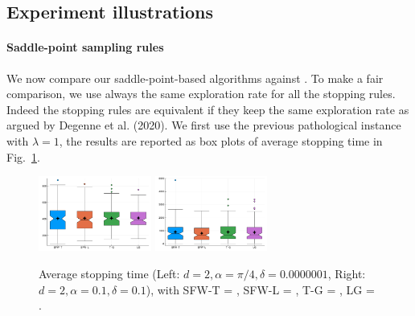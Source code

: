 \subsection{Experiment illustrations}

\paragraph{Saddle-point sampling rules}
We now compare our saddle-point-based algorithms against \LGapE. To make a fair comparison, we use always the same exploration rate for all the stopping rules. Indeed the stopping rules are equivalent if they keep the same exploration rate as argued by Degenne et al. (2020). We first use the previous pathological instance with $\lambda=1$, the results are reported as box plots of average stopping time in Fig.~\ref{fig:exp1}.

\begin{figure}[t!]
    \centering
    \includegraphics[width=0.33\textwidth]{Chapter4/img/exp_sin_-0000001}
    \includegraphics[width=0.33\textwidth]{Chapter4/img/exp_sin_-1}
    \caption{Average stopping time (Left: $d=2,\alpha=\pi/4,\delta=0.0000001$, Right: $d=2,\alpha=0.1,\delta=0.1$), with SFW-T = \SLTCC, SFW-L = \SLGapE, T-G = \LTCC, LG = \LGapE.}
    \label{fig:exp1}
\end{figure}
